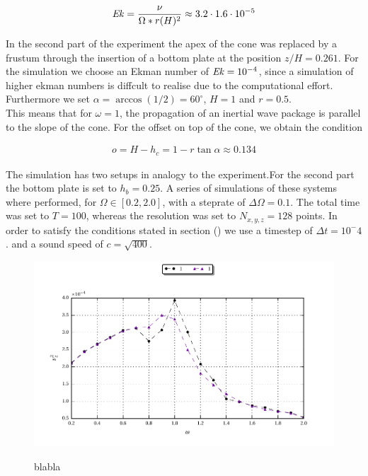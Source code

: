 \begin{align}
    \mbox{\textit{Ek}} = \frac{\nu}{\Omega*r (H)^2} \approx 3.2\cdot 1.6\cdot 10^{-5}
\end{align}

In the second part of the experiment the apex of the cone was replaced by a frustum through the
insertion of a bottom plate at the position $z/H = 0.261$.
For the simulation we choose an Ekman number of $\mbox{\textit{Ek}} =  10^{-4}$, since a simulation of higher ekman numbers is
diffcult to realise due to the computational effort.
Furthermore we set $\alpha = \arccos(1/2) = 60^{\circ}$, $H=1$ and $r=0.5$.\\
This means that for $\omega=1$, the propagation of an inertial wave package is parallel to the slope of the cone.
For the offset on top of the cone, we obtain the condition

\begin{align}
    o = H - h_c =  1 - r\tan{\alpha} \approx 0.134
\end{align}

The simulation has two setups in analogy to the experiment.For the second part the bottom plate is set to $h_b=0.25$.
A series of simulations of these systems where performed, for $\Omega \in [0.2, 2.0]$, with a steprate of $\Delta \Omega = 0.1$.
The total time was set to $T=100$, whereas the resolution was set to $N_{x,y,z} = 128$ points.
In order to satisfy the conditions stated in section () we use a timestep of $\Delta t = 10^-4$.
and a sound speed of $c = \sqrt{400}$.

\clearpage

\begin{figure}[!pt]
  \centering
  \includegraphics{gfx/cone/experiment/experiment.pdf}\label{fig:cone:expseries}
  \caption{blabla}
\end{figure}


